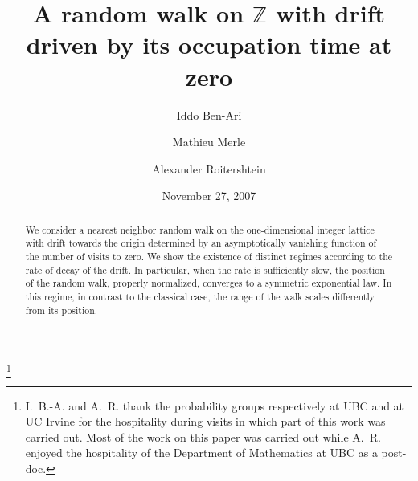 \documentclass[12pt]{amsart}
\begin{document}
\title{A random walk on ${{\mathbb Z}}$ with  drift driven by its occupation time at zero}
\author{Iddo Ben-Ari}
\address{Department of Mathematics, University of
California Irvine, 272 MSTB, Irvine, CA 92697-3875, USA}
\author{Mathieu Merle}
\address{Department of Mathematics,
University of British Columbia,  121-1984 Mathematics
Road, Vancouver, BC, Canada V6T 1Z2}
\author{Alexander Roitershtein}
\thanks{I.~B.-A. and A.~R. thank the probability groups respectively at UBC
and at UC Irvine for the hospitality during visits in which
part of this work was carried out. Most of the work on this paper
was carried out while A.~R. enjoyed the hospitality of the
Department of Mathematics at UBC as a post-doc.}
\address{Department of Mathematics, Iowa State University, 472 Carver Hall,
Ames, IA 50011, USA}
\date{November 27, 2007}
\begin{abstract}
We consider a nearest neighbor random walk on the one-dimensional
integer lattice with drift towards the origin determined by an
asymptotically vanishing function of the number of visits to zero.
We show the existence of distinct regimes according to the rate of
decay of the drift. In particular, when the rate is sufficiently
slow, the position of the random walk, properly normalized,
converges to a symmetric exponential law. In this regime, in
contrast to the classical case, the range of the walk scales
differently from its position.
\end{abstract}
\maketitle
\end{document}
